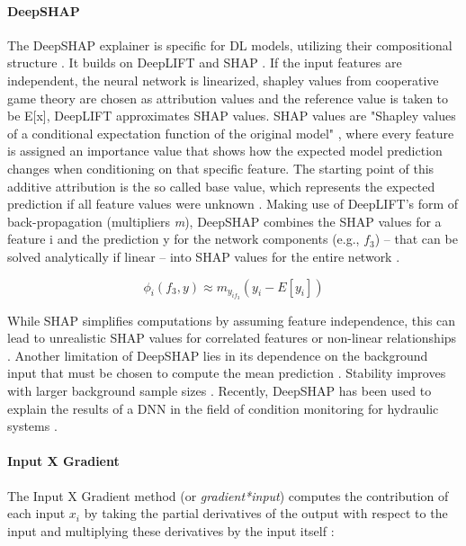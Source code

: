 \paragraph{DeepSHAP}
The DeepSHAP explainer is speciﬁc for DL models, utilizing their compositional structure . It builds on DeepLIFT  and SHAP .
If the input features are independent, the neural network is linearized, shapley values from cooperative game theory  are chosen as attribution values and the reference value is taken to be E[x], DeepLIFT approximates SHAP values. SHAP values are "Shapley values of a conditional expectation function of the original model" , where every feature is assigned an importance value that shows how the expected model prediction changes when conditioning on that specific feature. The starting point of this additive attribution is the so called base value, which represents the expected prediction if all feature values were unknown . Making use of DeepLIFT’s form of back-propagation (multipliers \textit{m}), DeepSHAP combines the SHAP values for a feature i and the prediction y for the network components (e.g., \( f_3 \)) – that can be solved analytically if linear – into SHAP values for the entire network .

$$\phi_i(f_3, y) \approx m_{y_{if_3}}(y_i - E[y_i])
$$

While SHAP simplifies computations by assuming feature independence, this can lead to unrealistic SHAP values for correlated features or non-linear relationships . Another limitation of DeepSHAP lies in its dependence on the background input that must be chosen to compute the mean prediction . Stability improves with larger background sample sizes  .
Recently, DeepSHAP has been used to explain the results of a DNN in the field of condition monitoring for hydraulic systems .

\paragraph{Input X Gradient}
The Input X Gradient method (or \textit{gradient*input}) computes the contribution of each input \( x_i \) by taking the partial derivatives of the output with respect to the input and multiplying these derivatives by the input itself :

